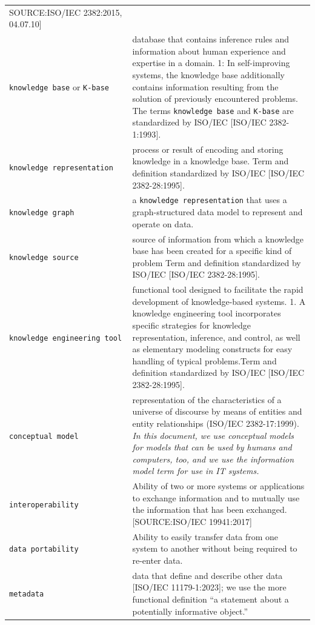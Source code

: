 \documentclass[
  letterpaper,
  DIV=11,
  numbers=noendperiod]{scrreprt}
\begin{document}
\begin{longtable}[]{@{}
  >{\raggedright\arraybackslash}p{}
  >{\raggedright\arraybackslash}p{}@{}}
{[}SOURCE:ISO/IEC 2382:2015, 04.07.10{]} \\
\texttt{knowledge\ base} or \texttt{K-base} & database that contains
inference rules and information about human experience and expertise in
a domain. 1: In self-improving systems, the knowledge base additionally
contains information resulting from the solution of previously
encountered problems. The terms \texttt{knowledge\ base} and
\texttt{K-base} are standardized by ISO/IEC {[}ISO/IEC
2382-1:1993{]}. \\
\texttt{knowledge\ representation} & process or result of encoding and
storing knowledge in a knowledge base. Term and definition standardized
by ISO/IEC {[}ISO/IEC 2382-28:1995{]}. \\
\texttt{knowledge\ graph} & a \texttt{knowledge\ representation} that
uses a graph-structured data model to represent and operate on data. \\
\texttt{knowledge\ source} & source of information from which a
knowledge base has been created for a specific kind of problem Term and
definition standardized by ISO/IEC {[}ISO/IEC 2382-28:1995{]}. \\
\texttt{knowledge\ engineering\ tool} & functional tool designed to
facilitate the rapid development of knowledge-based systems. 1. A
knowledge engineering tool incorporates specific strategies for
knowledge representation, inference, and control, as well as elementary
modeling constructs for easy handling of typical problems.Term and
definition standardized by ISO/IEC {[}ISO/IEC 2382-28:1995{]}. \\
\texttt{conceptual\ model} & representation of the characteristics of a
universe of discourse by means of entities and entity relationships
(ISO/IEC 2382-17:1999). \emph{In this document, we use conceptual models
for models that can be used by humans and computers, too, and we use the
information model term for use in IT systems.} \\
\texttt{interoperability} & Ability of two or more systems or
applications to exchange information and to mutually use the information
that has been exchanged. {[}SOURCE:ISO/IEC 19941:2017{]} \\
\texttt{data\ portability} & Ability to easily transfer data from one
system to another without being required to re-enter data. \\
\texttt{metadata} & data that define and describe other data {[}ISO/IEC
11179-1:2023{]}; we use the more functional definition ``a statement
about a potentially informative object.''


\end{longtable}
\end{document}
